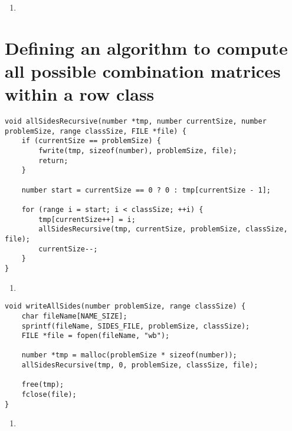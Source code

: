 \begin{enumerate}
\addtocounter{enumi}{1}
\item 
\end{enumerate}

\section{Defining an algorithm to compute all possible combination matrices within a row class}

\begin{lstlisting}[caption={},label={allSidesRecursive}]
void allSidesRecursive(number *tmp, number currentSize, number problemSize, range classSize, FILE *file) {
    if (currentSize == problemSize) {
        fwrite(tmp, sizeof(number), problemSize, file);
        return;
    }

    number start = currentSize == 0 ? 0 : tmp[currentSize - 1];

    for (range i = start; i < classSize; ++i) {
        tmp[currentSize++] = i;
        allSidesRecursive(tmp, currentSize, problemSize, classSize, file);
        currentSize--;
    }
}
\end{lstlisting}

\begin{enumerate}
\addtocounter{enumi}{1}
\item 
\end{enumerate}

\begin{lstlisting}[caption={},label={writeAllSides}]
void writeAllSides(number problemSize, range classSize) {
    char fileName[NAME_SIZE];
    sprintf(fileName, SIDES_FILE, problemSize, classSize);
    FILE *file = fopen(fileName, "wb");

    number *tmp = malloc(problemSize * sizeof(number));
    allSidesRecursive(tmp, 0, problemSize, classSize, file);

    free(tmp);
    fclose(file);
}
\end{lstlisting}

\begin{enumerate}
\addtocounter{enumi}{1}
\item 
\end{enumerate}

